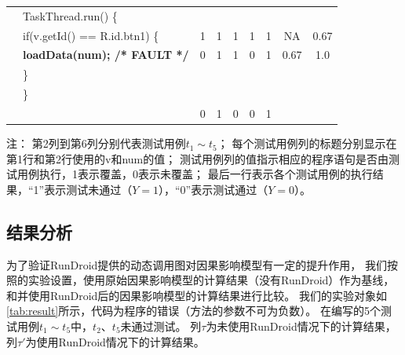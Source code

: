 \begin{table}[!ht]
\begin{center}
\begin{tabular}{|rl*{5} {|c}|c|c|}
			&TaskThread.run() \{                             &   &   &   &   &   &      &       \\
			
			&\quad if(v.getId() == R.id.btn1) \{                          & 1 & 1 & 1 & 1 & 1 &  NA   & 0.67 \\
			
			&\quad \quad \textbf{loadData(num); /* FAULT */} & 0 & 1 & 1 & 0 & 1 & 0.67    & 1.0  \\
			
			&\quad\}                                         &   &   &   &   &   &  &                \\
			
			&\}                                              &   &   &   &   &   &   &              \\
			
			\hline
			
			&                                                  & 0 & 1 & 0 & 0 & 1 &   &               \\
									\hline
		\end{tabular}
	\end{center}
\tiny
	注： 第2列到第6列分别代表测试用例$t_1\sim t_5$；
	每个测试用例列的标题分别显示在第1行和第2行使用的v和num的值；
	测试用例列的值指示相应的程序语句是否由测试用例执行，1表示覆盖，0表示未覆盖；   
	最后一行表示各个测试用例的执行结果，“1”表示测试未通过（$Y=1$），“0”表示测试通过（$Y=0$）。
	
\end{table}


\subsection{结果分析}


为了验证RunDroid提供的动态调用图对因果影响模型有一定的提升作用，
我们按照\cite{baah2010causal,baah2011mitigating}的实验设置，使用原始因果影响模型的计算结果（没有RunDroid）作为基线，和并使用RunDroid后的因果影响模型的计算结果进行比较。
我们的实验对象如\autoref{tab:result}所示，代码为程序的错误（方法的参数不可为负数）。
在编写的5个测试用例$t_1\sim t_5$中，$t_2$、$ t_5$未通过测试。
列$\tau$为未使用RunDroid情况下的计算结果，列$\tau'$为使用RunDroid情况下的计算结果。


